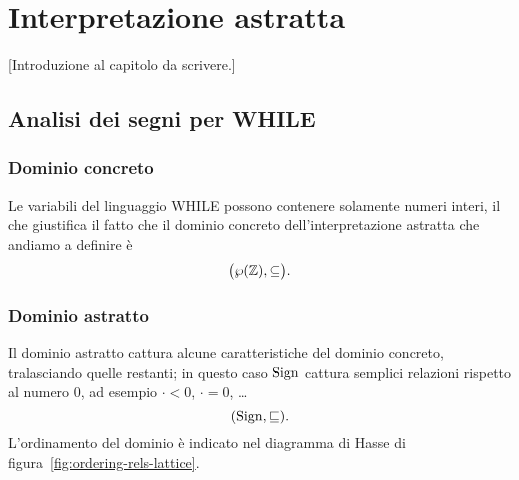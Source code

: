 
\chapter{Interpretazione astratta}

[Introduzione al capitolo da scrivere.]

\section{Analisi dei segni per WHILE}

\subsection{Dominio concreto}

Le variabili del linguaggio WHILE possono contenere solamente numeri interi,
il che giustifica il fatto che il dominio concreto dell'interpretazione
astratta che andiamo a definire è
\[
  \bigl(\wp(\mathbb{Z}), \subseteq\bigr).
\]

\subsection{Dominio astratto}

Il dominio astratto cattura alcune caratteristiche del dominio concreto,
tralasciando quelle restanti; in questo caso
$\mathrm{Sign}$ cattura semplici relazioni rispetto al
numero $0$, ad esempio $\cdot < 0$, $\cdot = 0$, \dots
\[
  (\mathrm{Sign}, \sqsubseteq).
\]
L'ordinamento del dominio è indicato nel diagramma di Hasse di
figura~\ref{fig:ordering-rels-lattice}.

